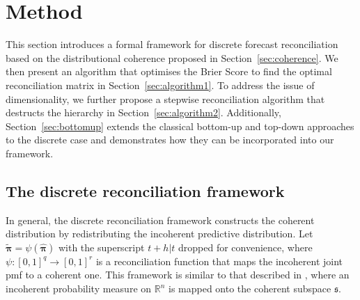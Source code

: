 \documentclass[a4paper,review,12pt,authoryear]{elsarticle}
\newcommand{\bpi}{\bm{\pi}}
\begin{document}
\section{Method}
\label{sec:method}

This section introduces a formal framework for discrete forecast reconciliation based on the distributional coherence proposed in Section~\ref{sec:coherence}.
We then present an algorithm that optimises the Brier Score to find the optimal reconciliation matrix in Section~\ref{sec:algorithm1}.
To address the issue of dimensionality, we further propose a stepwise reconciliation algorithm that destructs the hierarchy in Section~\ref{sec:algorithm2}.
Additionally, Section~\ref{sec:bottomup} extends the classical bottom-up and top-down approaches to the discrete case and demonstrates how they can be incorporated into our framework.

    \subsection{The discrete reconciliation framework}
    
    In general, the discrete reconciliation framework constructs the coherent distribution by redistributing the incoherent predictive distribution. 
    Let $\tilde{\bpi} = \psi(\hat{\bpi})$ with the superscript $t+h|t$ dropped for convenience, where $\psi:[0,1]^q \rightarrow [0,1]^r$ is a reconciliation function that maps the incoherent joint pmf to a coherent one. 
    This framework is similar to that described in \cite{panagiotelisProbabilisticForecastReconciliation2022}, where an incoherent probability measure on $\mathbb{R}^n$ is mapped onto the coherent subspace $\mathfrak{s}$.
\end{document}
